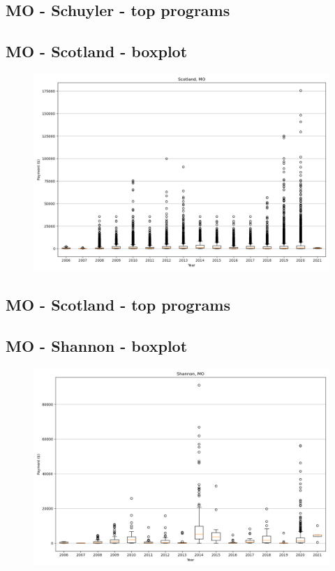 \subsection*{MO - Schuyler - top programs}

\newpage
\subsection*{MO - Scotland - boxplot}
\begin{figure}[h]
\centering
\includegraphics[width=7in]{../output/boxplots/counties/Scotland-MO_boxplot.png}
\end{figure}


\subsection*{MO - Scotland - top programs}

\newpage
\subsection*{MO - Shannon - boxplot}
\begin{figure}[h]
\centering
\includegraphics[width=7in]{../output/boxplots/counties/Shannon-MO_boxplot.png}
\end{figure}


